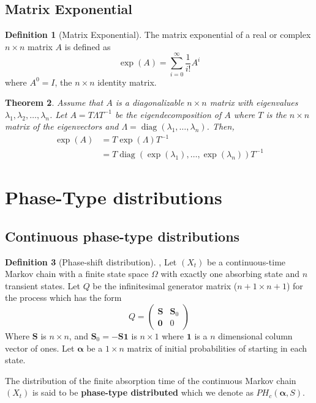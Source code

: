 \documentclass{article}
\theoremstyle{plain}
\newtheorem{theorem}{Theorem}[section]
\theoremstyle{definition}
\newtheorem{defn}[theorem]{Definition}
\theoremstyle{remark}
\numberwithin{equation}{section}
\begin{document}
\subsection{Matrix Exponential}

\begin{defn}[Matrix Exponential]
The matrix exponential of a real or complex $n \times n$ matrix $A$ is defined as
$$
\exp(A) = \sum_{i = 0}^\infty \frac{1}{i!} A^i
$$
where $A^0 = I$, the $n \times n$ identity matrix.
\end{defn}

\begin{theorem} \label{thm:eigen_matrix_exp}
Assume that $A$ is a diagonalizable $n \times n$ matrix with eigenvalues $\lambda_1, \lambda_2, \ldots, \lambda_n$.
Let $A = T \Lambda T^{-1}$ be the eigendecomposition of $A$ where $T$ is the $n \times n$ matrix of the eigenvectors and $\Lambda = \operatorname{diag}(\lambda_1, \ldots, \lambda_n)$.
Then,
\begin{align*}
    \exp(A) &= T \exp(\Lambda) T^{-1}\\
    &= T \operatorname{diag}(\exp(\lambda_1), \ldots, \exp(\lambda_n)) T^{-1}
\end{align*}
\end{theorem}

\section{Phase-Type distributions}

\subsection{Continuous phase-type distributions}
\begin{defn}[Phase-shift distribution] %
\cite{neuts1981}, \cite{maier1992}
Let $(X_t)$ be a continuous-time Markov chain with a finite state space $\Omega$ with exactly one absorbing state and $n$ transient states.
Let $Q$ be the infinitesimal generator matrix ($n + 1 \times n + 1$) for the process which has the form
$$
Q = \begin{pmatrix}
\mathbf{S} & \mathbf{S}_0\\
\mathbf{0} & 0
\end{pmatrix}
$$
Where $\mathbf{S}$ is $n \times n$, and $\mathbf{S}_0 = - \mathbf{S} \mathbf{1}$ is $n \times 1$ where $\mathbf{1}$ is a $n$ dimensional column vector of ones.
Let $\boldsymbol{\alpha}$ be a $1 \times n$ matrix of initial probabilities of starting in each state.

The distribution of the finite absorption time of the  continuous Markov chain $(X_t)$ is said to be \textbf{phase-type distributed} which we denote as $PH_c(\boldsymbol{\alpha}, S)$.
\end{defn}
\end{document}

